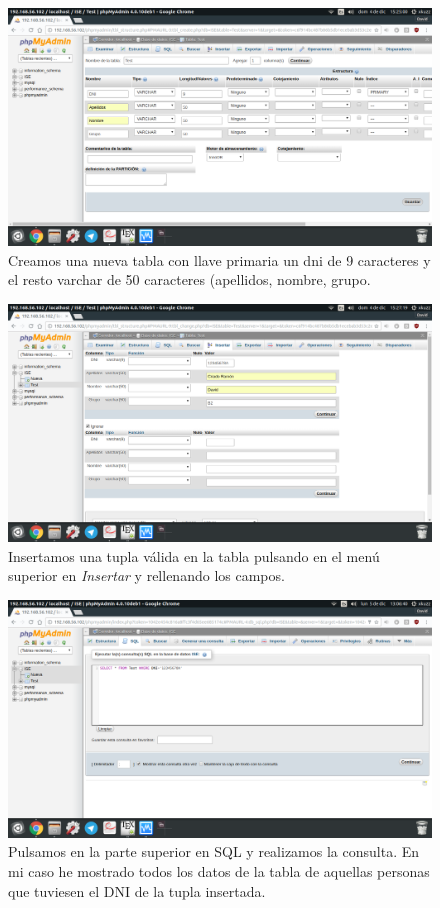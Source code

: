 \begin{figure}[H]
	\centering
	\includegraphics[scale=0.3]{mysql4.png}
	\caption{Creamos una nueva tabla con llave primaria un dni de 9 caracteres y el resto varchar de 50 caracteres (apellidos, nombre, grupo.}
\end{figure}

\begin{figure}[H]
	\centering
	\includegraphics[scale=0.3]{mysql5.png}
	\caption{Insertamos una tupla válida en la tabla pulsando en el menú superior en \textit{Insertar} y rellenando los campos.}
\end{figure}

\begin{figure}[H]
	\centering
	\includegraphics[scale=0.3]{mysqlQuery.png}
	\caption{Pulsamos en la parte superior en SQL y realizamos la consulta. En mi caso he mostrado todos los datos de la tabla de aquellas personas que tuviesen el DNI de la tupla insertada.}
\end{figure}

